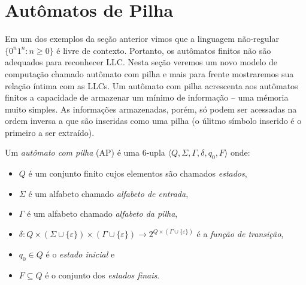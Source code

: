 



\section{Autômatos de Pilha}
\label{sec:ap}

Em um dos exemplos da seção anterior vimos que a linguagem não-regular $\{0^n1^n : n \geq 0\}$ é livre de contexto.
Portanto, os autômatos finitos não são adequados para reconhecer LLC.
Nesta seção veremos um novo modelo de computação chamado autômato com pilha e mais para frente mostraremos sua relação íntima com as LLCs.
Um autômato com pilha acrescenta aos autômatos finitos a capacidade de armazenar um mínimo de informação -- uma mémoria muito simples.
As informações armazenadas, porém, só podem ser acessadas na ordem inversa a que são inseridas como uma pilha (o úlitmo símbolo inserido é o primeiro a ser extraído).

Um {\em autômato com pilha} (AP) é uma 6-upla $\langle Q, \Sigma, \Gamma, \delta, q_0, F \rangle$ onde:
\begin{itemize}
\item $Q$ é um conjunto finito cujos elementos são chamados {\em estados},
\item $\Sigma$ é um alfabeto chamado {\em alfabeto de entrada},
\item $\Gamma$ é um alfabeto chamado {\em alfabeto da pilha},
\item $\delta: Q \times (\Sigma \cup \{\varepsilon\}) \times (\Gamma \cup \{\varepsilon\}) \to 2^{Q \times (\Gamma \cup \{\varepsilon\})}$ é a {\em função de transição},
\item $q_0 \in Q$ é o {\em estado inicial} e
\item $F \subseteq Q$ é o conjunto dos {\em estados finais}.
\end{itemize}

